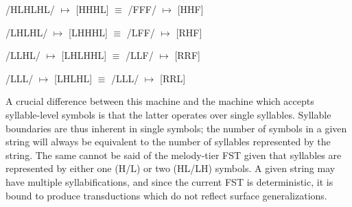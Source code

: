 \documentclass{article}
\newcommand{\R}{$\Rightarrow$}
\begin{document}
\begin{exe}
\ex \label{HLHLHL} /HLHLHL/ $\mapsto$ [HHHL] $\equiv$ /FFF/ $\mapsto$ [HHF] \\
\ex /LHLHL/ $\mapsto$ [LHHHL] $\equiv$ /LFF/ $\mapsto$ [RHF] \\
\ex /LLHL/ $\mapsto$ [LHLHHL] $\equiv$ /LLF/ $\mapsto$ [RRF] \\
\ex \label{LLL2} /LLL/ $\mapsto$ [LHLHL] $\equiv$ /LLL/ $\mapsto$ [RRL] \\
\end{exe}
A crucial difference between this machine and the machine which accepts syllable-level symbols is that the latter operates over single syllables. Syllable boundaries are thus inherent in single symbols; the number of symbols in a given string will always be equivalent to the number of syllables represented by the string. The same cannot be said of the melody-tier FST given that syllables are represented by either one (H/L) or two (HL/LH) symbols. A given string may have multiple syllabifications, and since the current FST is deterministic, it is bound to produce transductions which do not reflect surface generalizations.
\end{document}

